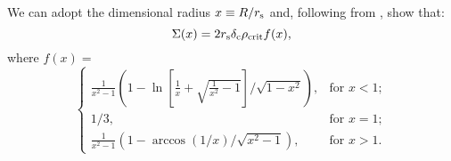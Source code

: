 \documentclass{emulateapj}
\begin{document}
We can adopt the dimensional radius $x \equiv R/r_{\rm s}$ and, following from \citet{Wright00}, show that:
\begin{equation}\label{sigma}
\Sigma(x) = 2 r_{\rm s} \delta_{\rm c} \rho_{\rm crit} f(x),
\end{equation}
where $f(x) = $
\begin{equation}
    \begin{cases}
        \frac{1}{x^2 - 1} \left( 1 - \ln{ \left[ \frac{1}{x} + \sqrt{\frac{1}{x^2} - 1} \right]} / \sqrt{1 - x^2} \right), & \text{for } x < 1; \\
        1/3, & \text{for } x = 1; \\
        \frac{1}{x^2 - 1} \left( 1 - \arccos{(1/x)} / \sqrt{x^2 - 1} \right), & \text{for } x > 1.
    \end{cases}
\end{equation}

\end{document}

